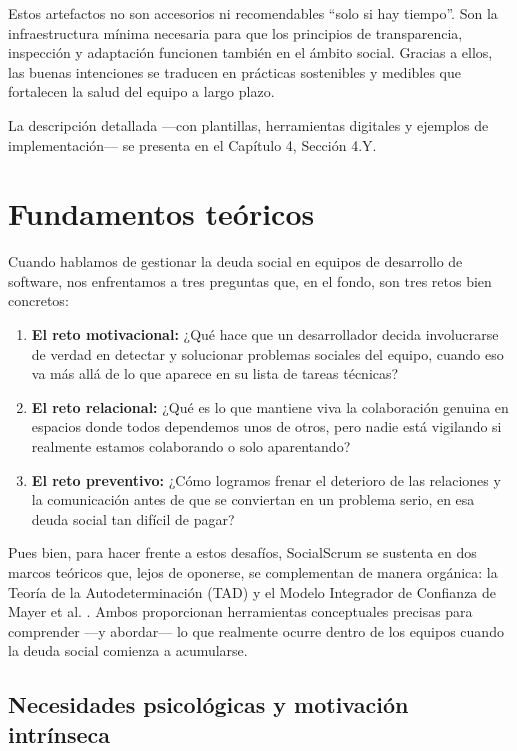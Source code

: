 Estos artefactos no son accesorios ni recomendables ``solo si hay tiempo''. Son la infraestructura mínima necesaria para que los principios de transparencia, inspección y adaptación funcionen también en el ámbito social.
Gracias a ellos, las buenas intenciones se traducen en prácticas sostenibles y medibles que fortalecen la salud del equipo a largo plazo.

La descripción detallada —con plantillas, herramientas digitales y ejemplos de implementación— se presenta en el Capítulo 4, Sección 4.Y.

\FloatBarrier

\section{Fundamentos teóricos}

Cuando hablamos de gestionar la deuda social en equipos de desarrollo de software, nos enfrentamos a tres preguntas que, en el fondo, son tres retos bien concretos:

\begin{enumerate}
    \item \textbf{El reto motivacional:} ¿Qué hace que un desarrollador decida involucrarse de verdad en detectar y solucionar problemas sociales del equipo, cuando eso va más allá de lo que aparece en su lista de tareas técnicas?
    \item \textbf{El reto relacional:} ¿Qué es lo que mantiene viva la colaboración genuina en espacios donde todos dependemos unos de otros, pero nadie está vigilando si realmente estamos colaborando o solo aparentando?
    \item \textbf{El reto preventivo:} ¿Cómo logramos frenar el deterioro de las relaciones y la comunicación antes de que se conviertan en un problema serio, en esa deuda social tan difícil de pagar?
\end{enumerate}

Pues bien, para hacer frente a estos desafíos, SocialScrum se sustenta en dos marcos teóricos que, lejos de oponerse, se complementan de manera orgánica: la Teoría de la Autodeterminación (TAD) \cite{ryan_self-determination_2000} y el Modelo Integrador de Confianza de Mayer et al. \cite{mayer_integrative_1995}. Ambos proporcionan herramientas conceptuales precisas para comprender —y abordar— lo que realmente ocurre dentro de los equipos cuando la deuda social comienza a acumularse.

\subsection{Necesidades psicológicas y motivación intrínseca}

